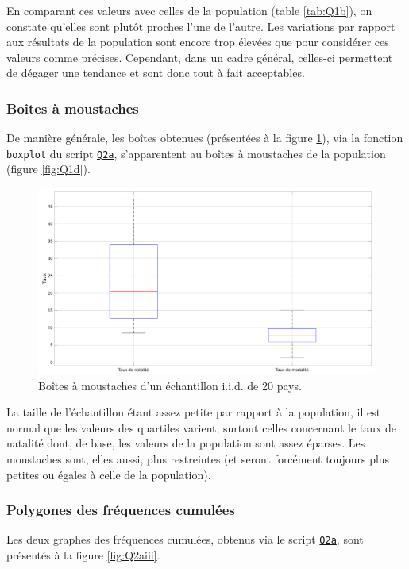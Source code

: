 \documentclass[a4paper, 12pt]{article}
\begin{document}
	En comparant ces valeurs avec celles de la population (table \ref{tab:Q1b}), on constate qu'elles sont plutôt proches l'une de l'autre. Les variations par rapport aux résultats de la population sont encore trop élevées que pour considérer ces valeurs comme précises. Cependant, dans un cadre général, celles-ci permettent de dégager une tendance et sont donc tout à fait acceptables.
	
	\subsubsection{Boîtes à moustaches}
	De manière générale, les boîtes obtenues (présentées à la figure \ref{fig:Q2aii}), via la fonction \texttt{boxplot} du script \hyperref[subsec:code-Q2]{\texttt{Q2a}}, s'apparentent au boîtes à moustaches de la population (figure \ref{fig:Q1d}).\par
	
	\begin{figure}[!ht]
	    \centering
	    \includegraphics[width=\textwidth]{resources/pdf/figures/Q2aii.pdf}
	    \caption{Boîtes à moustaches d'un échantillon i.i.d. de 20 pays.}
	    \label{fig:Q2aii}
	\end{figure}
	
	La taille de l'échantillon étant assez petite par rapport à la population, il est normal que les valeurs des quartiles varient; surtout celles concernant le taux de natalité dont, de base, les valeurs de la population sont assez éparses. Les moustaches sont, elles aussi, plus restreintes (et seront forcément toujours plus petites ou égales à celle de la population).
	
	\subsubsection{Polygones des fréquences cumulées}
	Les deux graphes des fréquences cumulées, obtenus via le script \hyperref[subsec:code-Q2]{\texttt{Q2a}}, sont présentés à la figure \ref{fig:Q2aiii}.\par
	
\end{document}

